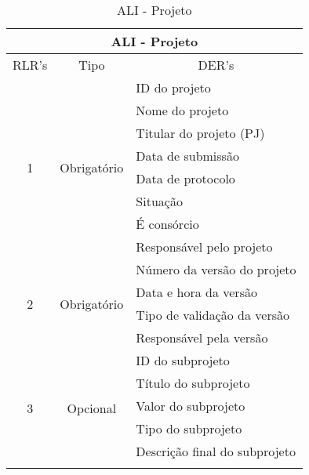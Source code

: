       \begin{table}[!h]
      \centering
      \caption{ALI - Projeto}
      \label{ali_projeto}
      \begin{tabular}{|c|c|l|}
      \hline
      \multicolumn{3}{|c|}{\textbf{ALI - Projeto}}                                                      \\ \hline
      \multicolumn{1}{|l|}{RLR's} & Tipo                         & \multicolumn{1}{c|}{DER's}  \\ \hline
      \multirow{8}{*}{1}          & \multirow{8}{*}{Obrigatório} & ID do projeto               \\ \cline{3-3} 
				  &                              & Nome do projeto             \\ \cline{3-3} 
				  &                              & Titular do projeto (PJ)     \\ \cline{3-3} 
				  &                              & Data de submissão           \\ \cline{3-3} 
				  &                              & Data de protocolo           \\ \cline{3-3} 
				  &                              & Situação                    \\ \cline{3-3} 
				  &                              & É consórcio                 \\ \cline{3-3} 
				  &                              & Responsável pelo projeto    \\ \hline
      \multirow{4}{*}{2}        & \multirow{4}{*}{Obrigatório} & Número da versão do projeto \\ \cline{3-3} 
				  &                              & Data e hora da versão       \\ \cline{3-3} 
				  &                              & Tipo de validação da versão \\ \cline{3-3} 
				  &                              & Responsável pela versão     \\ \hline
      \multirow{11}{*}{3}         &\multirow{11}{*}{Opcional}    & ID do subprojeto               \\ \cline{3-3} 
				  &                              & Título do subprojeto             \\ \cline{3-3} 
				  &                              & Valor do subprojeto      \\ \cline{3-3} 
				  &                              & Tipo do subprojeto          \\ \cline{3-3} 
				  &                              & Descrição final do subprojeto          \\ \cline{3-3} 

\end{tabular}
\end{table}

